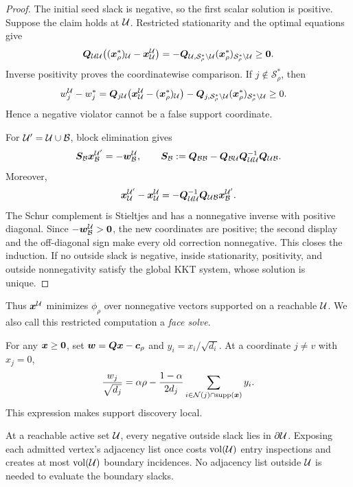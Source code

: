 \begin{proof}
The initial seed slack is negative, so the first scalar solution is
positive. Suppose the claim holds at $\mathcal{U}$. Restricted stationarity and the
optimal equations give
\begin{equation*}
 \bm{Q}_{\mathcal{U}\mathcal{U}}\bigl((\bm{x}_\rho^*)_{\mathcal{U}}-\bm{x}_{\mathcal{U}}^{\mathcal{U}}\bigr)
 =-\bm{Q}_{\mathcal{U},\mathcal S_\rho^*\setminus \mathcal{U}}
   (\bm{x}_\rho^*)_{\mathcal S_\rho^*\setminus \mathcal{U}}\geq\bm{0}.
\end{equation*}
Inverse positivity proves the coordinatewise comparison.  If
$j\notin\mathcal S_\rho^*$, then
\begin{align*}
 w_j^{\mathcal{U}}-w_j^*
 &=\bm{Q}_{j\mathcal{U}}\bigl(\bm{x}_{\mathcal{U}}^{\mathcal{U}}-(\bm{x}_\rho^*)_{\mathcal{U}}\bigr)
   -\bm{Q}_{j,\mathcal S_\rho^*\setminus \mathcal{U}}
     (\bm{x}_\rho^*)_{\mathcal S_\rho^*\setminus \mathcal{U}}\geq0.
\end{align*}
Hence a negative violator cannot be a false support coordinate.

For $\mathcal{U}'=\mathcal{U}\cup \mathcal{B}$, block elimination gives
\begin{equation*}
 \bm{S}_{\mathcal{B}}\bm{x}_{\mathcal{B}}^{\mathcal{U}'}=-\bm{w}_{\mathcal{B}}^{\mathcal{U}},
 \qquad
 \bm{S}_{\mathcal{B}}:=\bm{Q}_{\mathcal{B}\mathcal{B}}-\bm{Q}_{\mathcal{B}\mathcal{U}}\bm{Q}_{\mathcal{U}\mathcal{U}}^{-1}\bm{Q}_{\mathcal{U}\mathcal{B}}.
\end{equation*}
Moreover,
\begin{equation*}
 \bm{x}_{\mathcal{U}}^{\mathcal{U}'}-\bm{x}_{\mathcal{U}}^{\mathcal{U}}=-\bm{Q}_{\mathcal{U}\mathcal{U}}^{-1}\bm{Q}_{\mathcal{U}\mathcal{B}}\bm{x}_{\mathcal{B}}^{\mathcal{U}'}.
\end{equation*}
The Schur complement is Stieltjes and has a nonnegative inverse with
positive diagonal.  Since
$-\bm{w}_{\mathcal{B}}^{\mathcal{U}}>\bm{0}$, the new coordinates are positive; the second display and
the off-diagonal sign make every old correction nonnegative.  This closes the
induction.  If no outside slack is negative, inside stationarity, positivity,
and outside nonnegativity satisfy the global KKT system, whose solution is
unique.
\end{proof}

Thus $\bm{x}^{\mathcal{U}}$ minimizes $\phi_\rho$ over nonnegative vectors supported
on a reachable $\mathcal{U}$. We also call this restricted computation a
\emph{face solve}.

For any $\bm{x}\geq\bm{0}$, set $\bm{w}=\bm{Q}\bm{x}-\bm{c}_\rho$ and
$y_i=x_i/\sqrt{d_i}$. At a coordinate $j\neq v$ with $x_j=0$,
\begin{equation}
 \frac{w_j}{\sqrt{d_j}}
 =\alpha\rho-\frac{1-\alpha}{2d_j}
   \sum_{i\in\mathcal N(j)\cap\operatorname{supp}(\bm{x})}y_i.
 \label{eq:boundary-slack}
\end{equation}
This expression makes support discovery local.

\begin{corollary}
\label{cor:boundary-only-discovery}
At a reachable active set $\mathcal{U}$, every negative outside slack lies in
$\partial\mathcal{U}$. Exposing each admitted vertex's adjacency list once costs
$\operatorname{vol}(\mathcal{U})$ entry inspections and creates at most $\operatorname{vol}(\mathcal{U})$ boundary
incidences. No adjacency list outside $\mathcal{U}$ is needed to evaluate the
boundary slacks.
\end{corollary}

